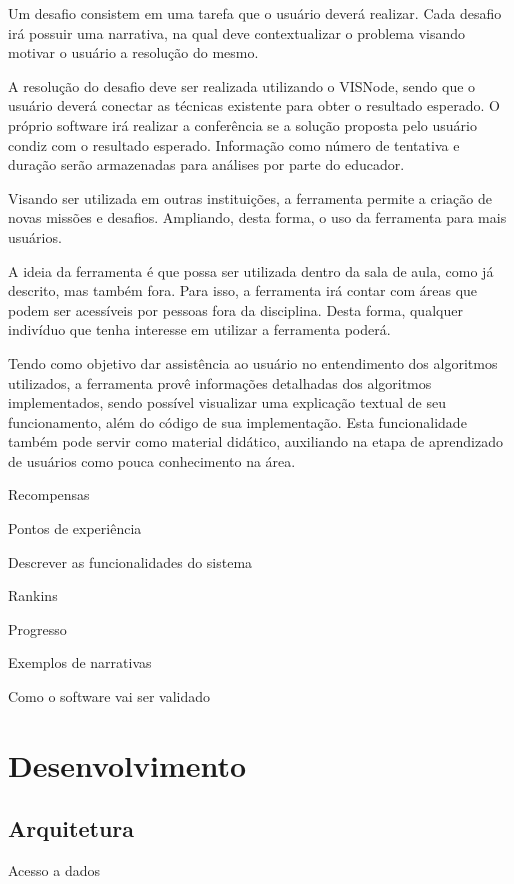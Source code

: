 \documentclass[
	12pt,				%
	oneside,			%
	a4paper,			%
	english,			%
	french,				%
	spanish,			%
	brazil,				%
	]{abntex2}
\begin{document}
Um desafio consistem em uma tarefa que o usuário deverá realizar. Cada desafio irá possuir uma narrativa, na qual deve contextualizar o problema visando motivar o usuário a resolução do mesmo.

A resolução do desafio deve ser realizada utilizando o VISNode, sendo que o usuário deverá conectar as técnicas existente para obter o resultado esperado. O próprio software irá realizar a conferência se a solução proposta pelo usuário condiz com o resultado esperado. Informação como número de tentativa e duração serão armazenadas para análises por parte do educador.

Visando ser utilizada em outras instituições, a ferramenta permite a criação de novas missões e desafios. Ampliando, desta forma, o uso da ferramenta para mais usuários.

A ideia da ferramenta é que possa ser utilizada dentro da sala de aula, como já descrito, mas também fora. Para isso, a ferramenta irá contar com áreas que podem ser acessíveis por pessoas fora da disciplina. Desta forma, qualquer indivíduo que tenha interesse em utilizar a ferramenta poderá.

Tendo como objetivo dar assistência ao usuário no entendimento dos algoritmos utilizados, a ferramenta provê informações detalhadas dos algoritmos implementados, sendo possível visualizar uma explicação textual de seu funcionamento, além do código de sua implementação. Esta funcionalidade também pode servir como material didático, auxiliando na etapa de aprendizado de usuários como pouca conhecimento na área.

Recompensas

Pontos de experiência

Descrever as funcionalidades do sistema

Rankins

Progresso

Exemplos de narrativas

Como o software vai ser validado

\chapter{Desenvolvimento} 


\section{Arquitetura}
Acesso a dados
\end{document}
